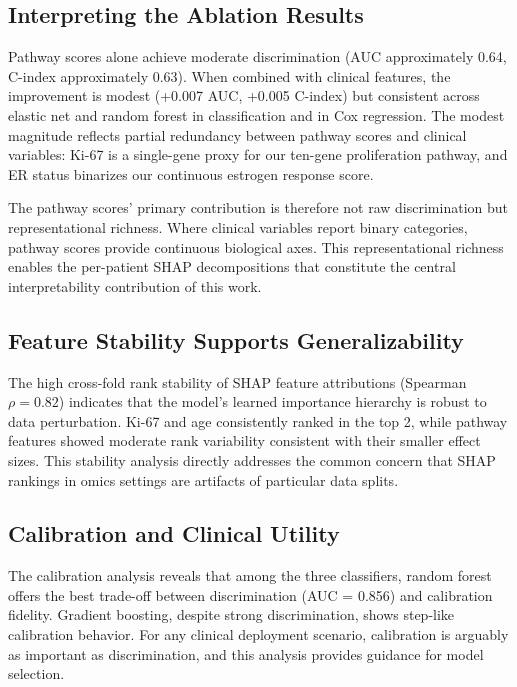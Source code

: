 \documentclass[journal]{IEEEtran}
\begin{document}
\subsection{Interpreting the Ablation Results}

Pathway scores alone achieve moderate discrimination (AUC approximately 0.64, C-index approximately 0.63). When combined with clinical features, the improvement is modest (+0.007 AUC, +0.005 C-index) but consistent across elastic net and random forest in classification and in Cox regression. The modest magnitude reflects partial redundancy between pathway scores and clinical variables: Ki-67 is a single-gene proxy for our ten-gene proliferation pathway, and ER status binarizes our continuous estrogen response score.

The pathway scores' primary contribution is therefore not raw discrimination but representational richness. Where clinical variables report binary categories, pathway scores provide continuous biological axes. This representational richness enables the per-patient SHAP decompositions that constitute the central interpretability contribution of this work.

\subsection{Feature Stability Supports Generalizability}

The high cross-fold rank stability of SHAP feature attributions (Spearman $\rho = 0.82$) indicates that the model's learned importance hierarchy is robust to data perturbation. Ki-67 and age consistently ranked in the top 2, while pathway features showed moderate rank variability consistent with their smaller effect sizes. This stability analysis directly addresses the common concern that SHAP rankings in omics settings are artifacts of particular data splits.

\subsection{Calibration and Clinical Utility}

The calibration analysis reveals that among the three classifiers, random forest offers the best trade-off between discrimination (AUC = 0.856) and calibration fidelity. Gradient boosting, despite strong discrimination, shows step-like calibration behavior. For any clinical deployment scenario, calibration is arguably as important as discrimination, and this analysis provides guidance for model selection.
\end{document}
